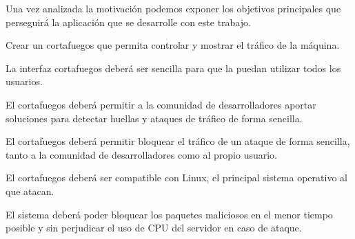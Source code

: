 Una vez analizada la motivación podemos exponer los objetivos principales que perseguirá la aplicación que se desarrolle con este trabajo.
\begin{objetive}
        \item Crear un cortafuegos que permita controlar y mostrar el tráfico de la máquina.
        \item La interfaz cortafuegos deberá ser sencilla para que la puedan utilizar todos los usuarios.
        \item El cortafuegos deberá permitir a la comunidad de desarrolladores aportar soluciones para detectar huellas y ataques de tráfico de forma sencilla.
        \item El cortafuegos deberá permitir bloquear el tráfico de un ataque de forma sencilla, tanto a la comunidad de desarrolladores como al propio usuario.
        \item El cortafuegos deberá ser compatible con Linux, el principal sistema operativo al que atacan.
        \item El sistema deberá poder bloquear los paquetes maliciosos en el menor tiempo posible y sin perjudicar el uso de CPU del servidor en caso de ataque.
\end{objetive}
